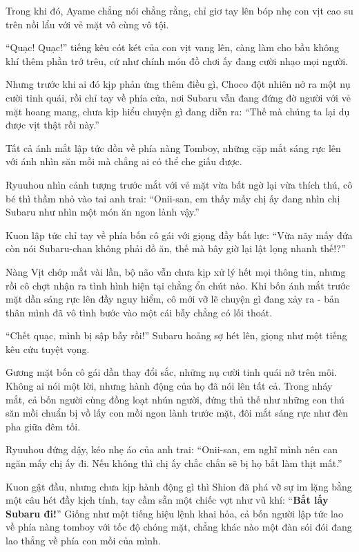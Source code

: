 \documentclass[../main.tex]{subfiles}
\begin{document}
Trong khi đó, Ayame chẳng nói chẳng rằng, chỉ giơ tay lên bóp nhẹ con vịt cao su trên nồi lẩu với vẻ mặt vô cùng vô tội.

``Quạc! Quạc!'' tiếng kêu cót két của con vịt vang lên, càng làm cho bầu không khí thêm phần trớ trêu, cứ như chính món đồ chơi ấy đang cười nhạo mọi người.

Nhưng trước khi ai đó kịp phản ứng thêm điều gì, Choco đột nhiên nở ra một nụ cười tinh quái, rồi chỉ tay về phía cửa, nơi Subaru vẫn đang đứng đờ người với vẻ mặt hoang mang, chưa kịp hiểu chuyện gì đang diễn ra: ``Thế mà chúng ta lại dụ được vịt thật rồi này.''

Tất cả ánh mắt lập tức dồn về phía nàng Tomboy, những cặp mắt sáng rực lên với ánh nhìn săn mồi mà chẳng ai có thể che giấu được.


Ryuuhou nhìn cảnh tượng trước mắt với vẻ mặt vừa bất ngờ lại vừa thích thú, cô bé thì thầm nhỏ vào tai anh trai: ``Onii-san, em thấy mấy chị ấy đang nhìn chị Subaru như nhìn một món ăn ngon lành vậy.''

Kuon lập tức chỉ tay về phía bốn cô gái với giọng đầy bất lực: ``Vừa nãy mấy đứa còn nói Subaru-chan không phải đồ ăn, thế mà bây giờ lại lật lọng nhanh thế!?''

Nàng Vịt chớp mắt vài lần, bộ não vẫn chưa kịp xử lý hết mọi thông tin, nhưng rồi cô chợt nhận ra tình hình hiện tại chẳng ổn chút nào. Khi bốn ánh mắt trước mặt dần sáng rực lên đầy nguy hiểm, cô mới vỡ lẽ chuyện gì đang xảy ra - bản thân mình đã vô tình bước vào một cái bẫy chẳng có lối thoát.

``Chết quạc, mình bị sập bẫy rồi!'' Subaru hoảng sợ hét lên, giọng như một tiếng kêu cứu tuyệt vọng.

Gương mặt bốn cô gái dần thay đổi sắc, những nụ cười tinh quái nở trên môi. Không ai nói một lời, nhưng hành động của họ đã nói lên tất cả. Trong nháy mắt, cả bốn người cùng đồng loạt nhún người, đứng thủ thế như những con thú săn mồi chuẩn bị vồ lấy con mồi ngon lành trước mặt, đôi mắt sáng rực như đèn pha giữa đêm tối.

Ryuuhou đứng dậy, kéo nhẹ áo của anh trai: ``Onii-san, em nghĩ mình nên can ngăn mấy chị ấy đi. Nếu không thì chị ấy chắc chắn sẽ bị họ bắt làm thịt mất.''

Kuon gật đầu, nhưng chưa kịp hành động gì thì Shion đã phá vỡ sự im lặng bằng một câu hét đầy kịch tính, tay cầm sẵn một chiếc vợt như vũ khí: ``\textbf{Bắt lấy Subaru đi!}'' Giống như một tiếng hiệu lệnh khai hỏa, cả bốn người lập tức lao về phía nàng tomboy với tốc độ chóng mặt, chẳng khác nào một đàn sói đói đang lao thẳng về phía con mồi của mình.
\end{document}
